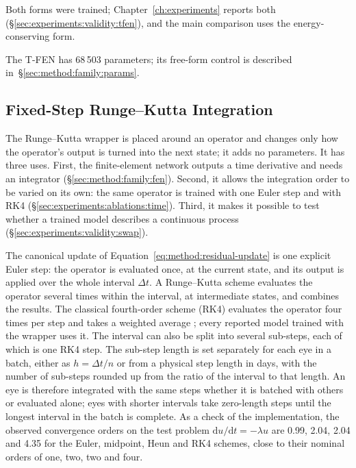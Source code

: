 Both forms were trained; Chapter~\ref{ch:experiments} reports both
(\S\ref{sec:experiments:validity:tfen}), and the main comparison uses the
energy-conserving form.

The T-FEN has 68\,503 parameters; its free-form control is described
in~\S\ref{sec:method:family:params}.

\subsection{Fixed-Step Runge--Kutta Integration}
\label{sec:method:family:rk}

The Runge--Kutta wrapper is placed around an operator and changes only how
the operator's output is turned into the next state; it adds no
parameters. It has three uses. First, the finite-element network outputs
a time derivative and needs an integrator (\S\ref{sec:method:family:fen}).
Second, it allows the integration order to be varied on its own: the same
operator is trained with one Euler step and with RK4
(\S\ref{sec:experiments:ablations:time}). Third, it makes it possible to
test whether a trained model describes a continuous process
(\S\ref{sec:experiments:validity:swap}).

The canonical update of Equation~\eqref{eq:method:residual-update} is one
explicit Euler step: the operator is evaluated once, at the current state,
and its output is applied over the whole interval $\Delta t$. A Runge--Kutta
scheme evaluates the operator several times within the interval, at
intermediate states, and combines the results. The classical fourth-order
scheme (RK4) \citep{Runge1895,Kutta1901} evaluates the operator four times
per step and takes a weighted average \citep{Butcher1987, Hairer1993};
every reported model trained with the wrapper uses it. The interval can
also be split into several sub-steps, each of which is one RK4 step. The
sub-step length is set separately for each eye in a batch, either as
$h = \Delta t / n$ or from a physical step length in days, with the number
of sub-steps rounded up from the ratio of the interval to that length. An
eye is therefore integrated with the same steps whether it is batched with
others or evaluated alone; eyes with shorter intervals take zero-length
steps until the longest interval in the batch is complete. As a check of
the implementation, the observed convergence orders on the test problem
$\mathrm{d}u / \mathrm{d}t = -\lambda u$ are 0.99, 2.04, 2.04 and 4.35 for
the Euler, midpoint, Heun and RK4 schemes, close to their nominal orders of
one, two, two and four.

